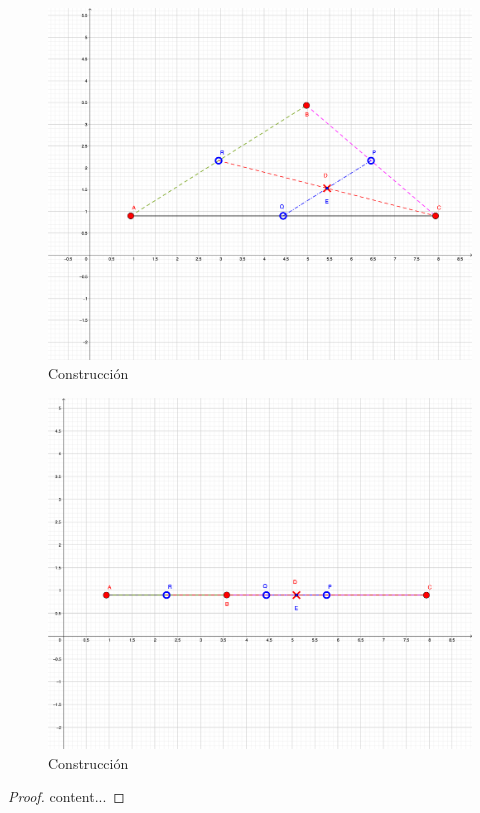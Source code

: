 	\begin{figure}[H]
	\centering
	\includegraphics[scale=1]{Images/P4.png}
	\caption{Construcción}
\end{figure}
	\begin{figure}[H]
	\centering
	\includegraphics[scale=1]{Images/P4-1.png}
	\caption{Construcción}
\end{figure}

\begin{proof}
	content...
\end{proof}

